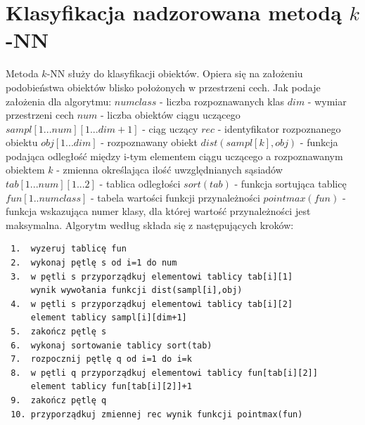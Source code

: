 \documentclass{classrep}
\begin{document}
\section{Klasyfikacja nadzorowana metodą $k$-NN}
Metoda $k$-NN służy do klasyfikacji obiektów. Opiera się na założeniu podobieństwa obiektów blisko położonych w przestrzeni cech. Jak podaje  założenia dla algorytmu:
\newline $numclass$ - liczba rozpoznawanych klas
\newline $dim$ - wymiar przestrzeni cech
\newline $num$ - liczba obiektów ciągu uczącego
\newline $sampl[1... num][1...dim+1]$ - ciąg uczący
\newline $rec$ - identyfikator rozpoznanego obiektu
\newline $obj[1...dim]$ - rozpoznawany obiekt
\newline $dist(sampl[k],obj)$ - funkcja podająca odległość między i-tym elementem ciągu uczącego a rozpoznawanym obiektem  
\newline $k$ - zmienna określająca ilość uwzględnianych sąsiadów
\newline $tab[1...num][1...2]$ - tablica odległości
\newline $sort(tab)$ - funkcja sortująca tablicę
\newline $fun[1..numclass]$ - tabela wartości funkcji przynależności
\newline $pointmax(fun)$  - funkcja wskazująca numer klasy, dla której wartość przynależności jest maksymalna. Algorytm według  składa się z następujących kroków:
\newline
\begin{verbatim}
 1.  wyzeruj tablicę fun
 2.  wykonaj pętlę s od i=1 do num
 3.  w pętli s przyporządkuj elementowi tablicy tab[i][1]
     wynik wywołania funkcji dist(sampl[i],obj)
 4.  w pętli s przyporządkuj elementowi tablicy tab[i][2]
     element tablicy sampl[i][dim+1]
 5.  zakończ pętlę s
 6.  wykonaj sortowanie tablicy sort(tab)
 7.  rozpocznij pętlę q od i=1 do i=k
 8.  w pętli q przyporządkuj elementowi tablicy fun[tab[i][2]]
     element tablicy fun[tab[i][2]]+1
 9.  zakończ pętlę q
 10. przyporządkuj zmiennej rec wynik funkcji pointmax(fun)
\end{verbatim}
\end{document}
